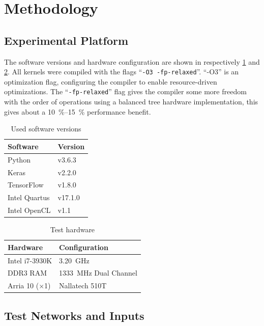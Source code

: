 \documentclass[techrep,english]{ipsj} %
\begin{document}
{\section{Methodology}\label{sec:method}
\subsection{Experimental Platform}
The software versions and hardware configuration are shown in respectively \cref{tab:software-versions} and \cref{tab:test-hardware}.
All kernels were compiled with the flags ``\texttt{-O3 -fp-relaxed}''.
``-O3'' is an optimization flag, configuring the compiler to enable resource-driven optimizations. %
The ``\texttt{-fp-relaxed}'' flag gives the compiler some more freedom with the order of operations using a balanced tree hardware implementation, this gives about a \SIrange{10}{15}{\percent} performance benefit.%
\begin{table}[h]
  \centering
  \caption{Used software versions}\label{tab:software-versions}
  \begin{tabular}{ll}
    \toprule
    \textbf{Software} & \textbf{Version} \\
    \midrule
    Python & v3.6.3 \\
    Keras & v2.2.0 \\
    TensorFlow & v1.8.0 \\
    Intel Quartus & v17.1.0 \\
    Intel OpenCL & v1.1 \\
    \bottomrule
  \end{tabular}
\end{table}
\begin{table}[h]
  \centering
  \caption{Test hardware}\label{tab:test-hardware}
  \begin{tabular}{ll}
    \toprule
    \textbf{Hardware} & \textbf{Configuration} \\
    \midrule
    Intel i7-3930K & \SI{3.20}{\giga\hertz} \\
    DDR3 RAM & \SI{1333}{\mega\hertz} Dual Channel \\
    Arria 10 ($\times$1) & Nallatech 510T \\
    \bottomrule
  \end{tabular}
\end{table}

\subsection{Test Networks and Inputs}

}
\end{document}
